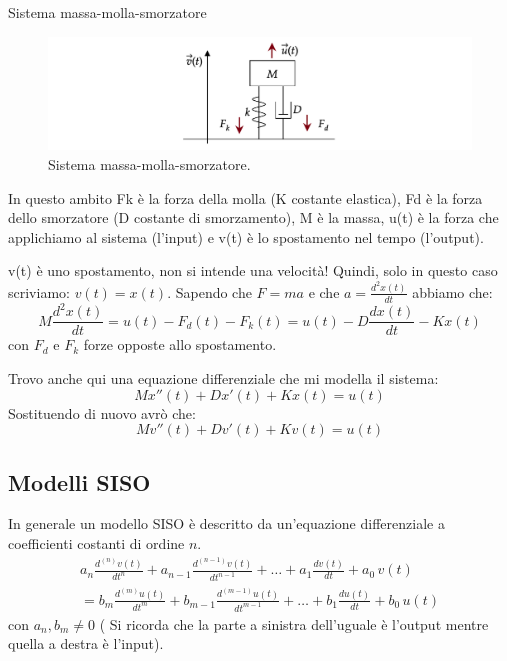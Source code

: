 \begin{nexample}
	\label{es_mms}
	Sistema massa-molla-smorzatore 
	
		\begin{figure}[H]
			\centering
			\includegraphics{immagini/cap3_Sistemi/massa_molla_smorzatore.pdf}
			\caption{ Sistema massa-molla-smorzatore. }
			\label{fig: massa_molla_smorzatore}
		\end{figure}
		
		In questo ambito Fk è la forza della molla (K costante elastica), Fd è la forza dello smorzatore (D costante di smorzamento), M è la massa, u(t) è la forza che applichiamo al sistema (l'input) e v(t) è lo spostamento nel tempo (l'output).
		
		\begin{NB}
			 v(t) è uno spostamento, non si intende una velocità! Quindi, solo in questo caso scriviamo: $ v(t) = x(t) $.
			Sapendo che $ F=ma $ e che $a= \frac{d^2 x(t)}{dt} $ abbiamo che:
			\[  M \frac{d^2 x(t)}{dt} = u(t) - F_d(t) - F_k(t) = u(t) - D \frac{d x(t)}{dt} - K x(t) \]
			con $ F_d $ e $ F_k $ forze opposte allo spostamento.
		\end{NB}
		
		Trovo anche qui una equazione differenziale che mi modella il sistema:
		\[  M x''(t) + D x'(t) + K x(t) = u(t) \]
		Sostituendo di nuovo avrò che:
		\[ M v''(t) + D v'(t) + K v(t) = u(t) \]
\end{nexample}


\subsection{Modelli SISO}

	In generale un modello SISO è descritto da un'equazione differenziale a coefficienti costanti di ordine $ n $.
	\begin{multline}
		a_n \frac{d^{(n)} v(t)}{dt^n} 
			+ a_{n-1} \frac{d^{(n-1)} v(t)}{dt^{n-1}} 
			+ \dots 
			+ a_1 \frac{dv(t)}{dt} 
			+ a_0\,v(t)\\
		= b_m \frac{d^{(m)} u(t)}{dt^m}
			+ b_{m-1} \frac{d^{(m-1)} u(t)}{dt^{m-1}} 
			+ \dots
			+ b_1 \frac{du(t)}{dt} 
			+ b_0\,u(t)
	\tag{2}\label{equation 2}
	\end{multline}
	con $ a_n, b_m \ne 0 $ ( Si ricorda che la parte a sinistra dell'uguale è l'output mentre quella a destra è l'input).
	
